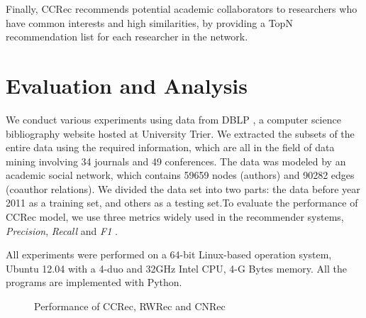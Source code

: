 \documentclass{acm_proc_article-sp}
\begin{document}
Finally, CCRec recommends potential academic collaborators to researchers who have common interests and high similarities, by providing a TopN recommendation list for each researcher in the network.

\section{Evaluation and Analysis}
We conduct various experiments using data from DBLP \cite{Ley:DBLP}, a computer science bibliography website hosted at University Trier. We extracted the subsets of the entire data using the required information, which are all in the field of data mining involving 34 journals and 49 conferences. The data was modeled by an academic social network, which contains 59659 nodes (authors) and 90282 edges (coauthor relations). We divided the data set into two parts: the data before year 2011 as a training set, and others as a testing set.To evaluate the performance of CCRec model, we use three metrics widely used in the recommender systems, \emph{Precision}, \emph{Recall} and \emph{F1} \cite{shani2011evaluating}.

All experiments were performed on a 64-bit Linux-based operation system, Ubuntu 12.04 with a 4-duo and 32GHz Intel CPU, 4-G Bytes memory. All the programs are implemented with Python.

\begin{figure}
\centering
{}
\caption{Performance of CCRec, RWRec and CNRec}
\label{fig:5}       %
\end{figure}
\end{document}
